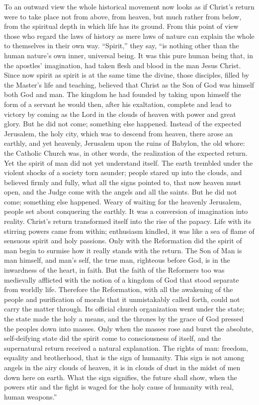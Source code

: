 \documentclass[12pt,a4paper,openany]{book}
\newcommand{\opage}[1]{\marginnote{\footnotesize\textit{[#1]}}}
\begin{document}
To an outward view the whole
historical movement now looks as if Christ's return
were to take place not from above, from heaven, but much rather
from below, from the spiritual depth in which life has its ground.
From this point of view those who regard the laws of history
as mere laws of nature can explain the whole to themselves
in their own way. ``Spirit,'' they say, ``is nothing other than the
human nature's own inner, universal being.
It was this pure human being that, in the apostles'
imagination, had taken flesh and blood in the man
Jesus Christ. Since now spirit as spirit is at the same time
the divine, those disciples, filled by the Master's life
and teaching, believed that Christ as the Son of God
was himself both God and man. The kingdom he
had founded by taking upon himself the form of a servant
he would then, after his exaltation, complete and lead to
victory by coming as the Lord in the clouds of heaven with
power and great glory. But he did not come; something
else happened. Instead of the expected Jerusalem,
the holy city, which was to descend from heaven,
there arose an earthly, and yet heavenly, Jerusalem upon
the ruins of Babylon, the old whore: the Catholic
\setcounter{footnote}{0}%
\opage{51}Church was, in other words, the realization of the expected
return. Yet the spirit of man did not
yet understand itself. The earth trembled under the violent
shocks of a society torn asunder; people stared up
into the clouds, and believed firmly and fully, what all the signs pointed
to, that now heaven must open, and the Judge
come with the angels and all the saints. But he
did not come; something else happened. Weary of waiting
for the heavenly Jerusalem, people set about
conquering the earthly. It was a conversion of
imagination into reality. Christ's return transformed
itself into the rise of the papacy. Life with its stirring
powers came from within; enthusiasm kindled, it was
like a sea of flame of sensuous spirit and holy passions.
Only with the Reformation did the spirit of man begin
to surmise how it really stands with the
return. The Son of Man is man himself,
and man's self, the true man, righteous before God,
is in the inwardness of the heart, in faith. But the faith of the
Reformers too was medievally afflicted with the notion
of a kingdom of God that stood separate from worldly
life. Therefore the Reformation, with all the
awakening of the people and purification of morals that it unmistakably
called forth, could not carry the matter through. Its
official church organization went under the state; the state
made the holy a means, and the thrones by the grace of God
pressed the peoples down into masses. Only when
the masses rose and burst the absolute, self-deifying
state did the spirit come to consciousness of itself,
and the supernatural return received a natural
explanation. The rights of man: freedom, equality and
brotherhood, that is the sign of humanity. This sign
\setcounter{footnote}{0}%
\opage{52}is not among angels in the airy clouds of heaven, it is in
clouds of dust in the midst of men down here on earth.
What the sign signifies, the future shall show, when the powers
stir and the fight is waged for the holy cause
of humanity with real, human weapons.''
\end{document}
